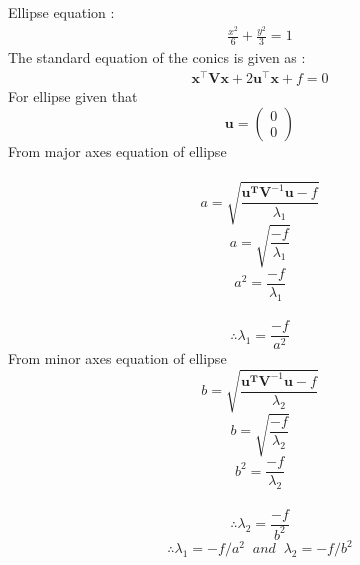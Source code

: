 \documentclass[10pt, a4paper]{article}
\newcommand{\myvec}[1]{\ensuremath{\begin{pmatrix}#1\end{pmatrix}}}
\let\vec\mathbf
\begin{document}
Ellipse equation : \begin{align}
\frac{x^2}{6}+\frac{y^2}{3}=1
  \end{align}
The standard equation of the conics is given as :
\begin{align}
\vec{x}^{\top}\vec{V}\vec{x}+2\vec{u}^{\top}\vec{x}+f=0
\end{align}
For ellipse given that
\begin{equation}
\vec{u}=\myvec{0\\0}
\end{equation} 
From major axes equation of ellipse\\\\
\begin{equation}
a=\sqrt{\frac{\vec{u^T}\vec{V}^{-1}\vec{u}-f}{\lambda_1}}
\end{equation}
\begin{equation}
a=\sqrt{\frac{-f}{\lambda_1}}
\end{equation}
\begin{equation}
a^2=\frac{-f}{\lambda_1}
\end{equation}\\
\begin{equation}
\therefore \lambda_1=\frac{-f}{a^2}
\end{equation}
From minor axes equation of ellipse\\
\begin{equation}
b=\sqrt{\frac{\vec{u^T}\vec{V}^{-1}\vec{u}-f}{\lambda_2}}
\end{equation}
\begin{equation}
b=\sqrt{\frac{-f}{\lambda_2}}
\end{equation}
\begin{equation}
b^2=\frac{-f}{\lambda_2}
\end{equation}\\
\begin{equation}
\therefore \lambda_2=\frac{-f}{b^2}
\end{equation}
\begin{equation}
\therefore\lambda_1=-f/a^2 \;\;and\;\;\lambda_2=-f/b^2
\end{equation}
\end{document}
